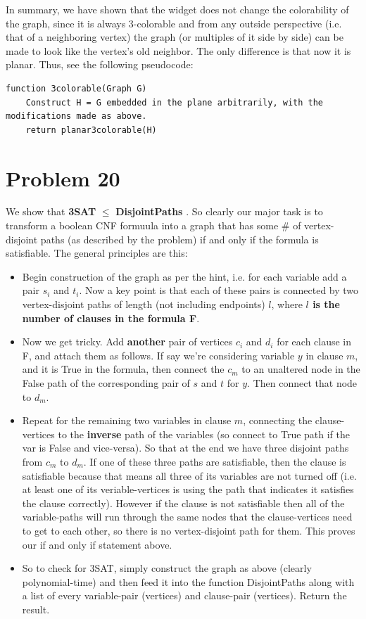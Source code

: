 \documentclass{article}
\providecommand{\prob}[1]{\section*{Problem #1}}
\providecommand{\reducible}[2]{
  \textbf{#1} $\leq$ \textbf{#2}
}
\begin{document}
In summary, we have shown that the widget does not change the colorability of the graph, since it is always 3-colorable and from any outside perspective (i.e. that of a neighboring vertex) the graph (or multiples of it side by side) can be made to look like the vertex's old neighbor. The only difference is that now it is planar. Thus, see the following pseudocode:\\
\begin{lstlisting}
function 3colorable(Graph G)
    Construct H = G embedded in the plane arbitrarily, with the modifications made as above.
    return planar3colorable(H)
\end{lstlisting}


\prob{20}
We show that \reducible{3SAT}{DisjointPaths}. So clearly our major task is to transform a boolean CNF formuula into a graph that has some \# of vertex-disjoint paths (as described by the problem) if and only if the formula is satisfiable. The general principles are this:
\begin{itemize}
  \item Begin construction of the graph as per the hint, i.e. for each variable add a pair $s_i$ and $t_i$. Now a key point is that each of these pairs is connected by two vertex-disjoint paths of length (not including endpoints) $l$, where \textbf{$l$ is the number of clauses in the formula F}.
  \item Now we get tricky. Add \textbf{another} pair of vertices $c_i$ and $d_i$ for each clause in F, and attach them as follows. If say we're considering variable $y$ in clause $m$, and it is True in the formula, then connect the $c_m$ to an unaltered node in the False path of the corresponding pair of $s$ and $t$ for $y$. Then connect that node to $d_m$.
  \item Repeat for the remaining two variables in clause $m$, connecting the clause-vertices to the \textbf{inverse} path of the variables (so connect to True path if the var is False and vice-versa). So that at the end we have three disjoint paths from $c_m$ to $d_m$. If one of these three paths are satisfiable, then the clause is satisfiable because that means all three of its variables are not turned off (i.e. at least one of its veriable-vertices is using the path that indicates it satisfies the clause correctly). However if the clause is not satisfiable then all of the variable-paths will run through the same nodes that the clause-vertices need to get to each other, so there is no vertex-disjoint path for them. This proves our if and only if statement above.
  \item So to check for 3SAT, simply construct the graph as above (clearly polynomial-time) and then feed it into the function DisjointPaths along with a list of every variable-pair (vertices) and clause-pair (vertices). Return the result.
\end{itemize}
\end{document}
